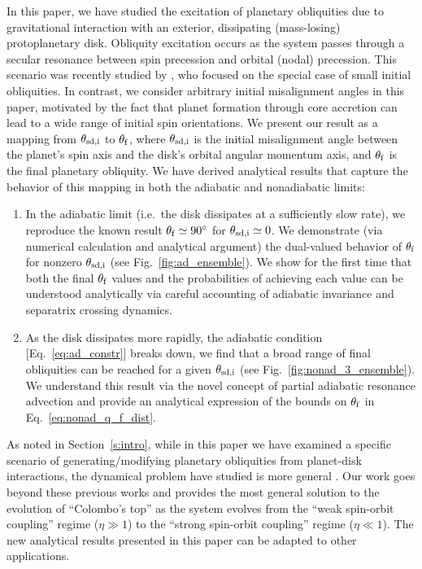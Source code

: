 \documentclass[twocolumn,twocolappendix]{aastex63}
\begin{document}
In this paper, we have studied the excitation of planetary obliquities due to
gravitational interaction with an exterior, dissipating (mass-losing)
protoplanetary disk. Obliquity excitation occurs as the system passes through a
secular resonance between spin precession and orbital (nodal) precession. This
scenario was recently studied by \citet{millholland_disk}, who focused on the
special case of small initial obliquities.  In contrast, we consider arbitrary
initial misalignment angles in this paper, motivated by the fact that planet
formation through core accretion can lead to a wide range of initial spin
orientations.  We present our result as a mapping from $\theta_{\rm sd, i}$ to
$\theta_{\rm f}$, where $\theta_{\rm sd, i}$ is the initial misalignment angle
between the planet's spin axis and the disk's orbital angular momentum axis, and
$\theta_{\rm f}$ is the final planetary obliquity. We have derived analytical
results that capture the behavior of this mapping in both the adiabatic and
nonadiabatic limits:
\begin{enumerate}
    \item In the adiabatic limit (i.e.\ the disk dissipates at a
        sufficiently slow rate), we reproduce the known result $\theta_{\rm f}
        \simeq 90^\circ$ for $\theta_{\rm sd, i} \simeq 0$. We demonstrate (via
        numerical calculation and analytical argument) the dual-valued behavior
        of $\theta_{\rm f}$ for nonzero $\theta_{\rm sd, i}$ (see
        Fig.~\ref{fig:ad_ensemble}). We show for the first time
        that both the final $\theta_{\rm f}$ values and the probabilities of
        achieving each value can be understood analytically
        via careful accounting of adiabatic invariance and separatrix crossing
        dynamics.

    \item As the disk dissipates more rapidly, the adiabatic condition
        [Eq.~\eqref{eq:ad_constr}] breaks down, we find that a broad range of
        final obliquities can be reached for a given $\theta_{\rm sd, i}$ (see
        Fig.~\ref{fig:nonad_3_ensemble}). We understand this
        result via the novel concept of partial adiabatic resonance advection
        and provide an analytical expression of the bounds on $\theta_{\rm f}$
        in Eq.~\eqref{eq:nonad_q_f_dist}.
\end{enumerate}

As noted in Section~\ref{s:intro}, while in this paper we have examined a
specific scenario of generating/modifying planetary obliquities from planet-disk
interactions, the dynamical problem have studied is more general
\citep{colombo1966,peale1969,peale1974possible,ward1975tidal,henrard1987}. Our
work goes beyond these previous works and provides the most general solution to
the evolution of ``Colombo's top'' as the system evolves from the ``weak
spin-orbit coupling'' regime ($\eta\gg 1$) to the ``strong spin-orbit coupling''
regime ($\eta\ll 1$).  The new analytical results presented in this paper can be
adapted to other applications.
\end{document}
